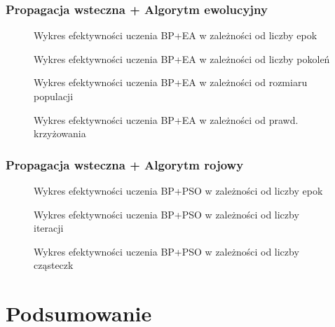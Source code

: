 \documentclass[11pt,a4paper,oneside]{report}
\begin{document}
\subsection{Propagacja wsteczna + Algorytm ewolucyjny}

\begin{figure}[H]
	\caption{Wykres efektywności uczenia BP+EA w zależności od liczby epok \label{figure:bp_ea_epochs}}
	
\end{figure}

\begin{figure}[H]
	\caption{Wykres efektywności uczenia BP+EA w zależności od liczby pokoleń \label{figure:bp_ea_generations}}
	
\end{figure}

\begin{figure}[H]
	\caption{Wykres efektywności uczenia BP+EA w zależności od rozmiaru populacji \label{figure:bp_ea_population}}
	
\end{figure}

\begin{figure}[H]
	\caption{Wykres efektywności uczenia BP+EA w zależności od prawd. krzyżowania \label{figure:bp_ea_cp}}
	
\end{figure}

\subsection{Propagacja wsteczna + Algorytm rojowy}

\begin{figure}[H]
	\caption{Wykres efektywności uczenia BP+PSO w zależności od liczby epok \label{figure:bp_pso_epochs}}
	
\end{figure}

\begin{figure}[H]
	\caption{Wykres efektywności uczenia BP+PSO w zależności od liczby iteracji \label{figure:bp_pso_generations}}
	
\end{figure}

\begin{figure}[H]
	\caption{Wykres efektywności uczenia BP+PSO w zależności od liczby cząsteczk \label{figure:bp_pso_population}}
	
\end{figure}

\chapter{Podsumowanie}
\end{document}
